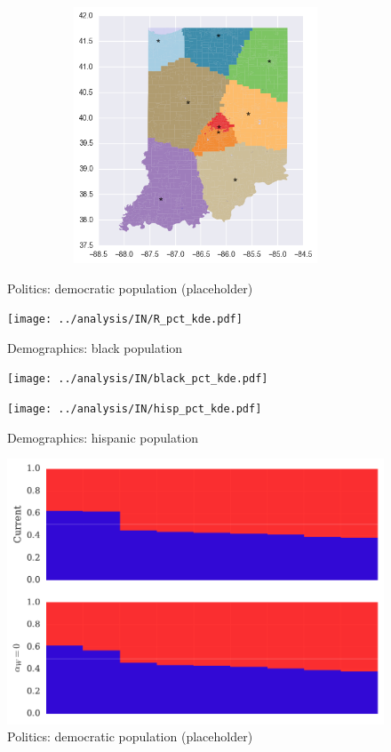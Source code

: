 \begin{figure}[htb!]
\includegraphics[width=5in,height=3in,keepaspectratio]{../maps/IN/static/0_25_after.png}
\end{figure}

\clearpage
\newpage

\begin{figure}[htb!] \centering
\caption{ Politics: democratic population (placeholder)}
\texttt{[image: ../analysis/IN/R\_pct\_kde.pdf]}
\caption{ Demographics: black population }
\texttt{[image: ../analysis/IN/black\_pct\_kde.pdf]}
\caption{ Demographics: hispanic population }
\texttt{[image: ../analysis/IN/hisp\_pct\_kde.pdf]}
\end{figure}

\clearpage
\newpage

\begin{figure}[htb!] \centering
\caption{ Politics: democratic population (placeholder)}
\includegraphics[width=6in]{../analysis/IN/barplot.pdf}
\end{figure}

